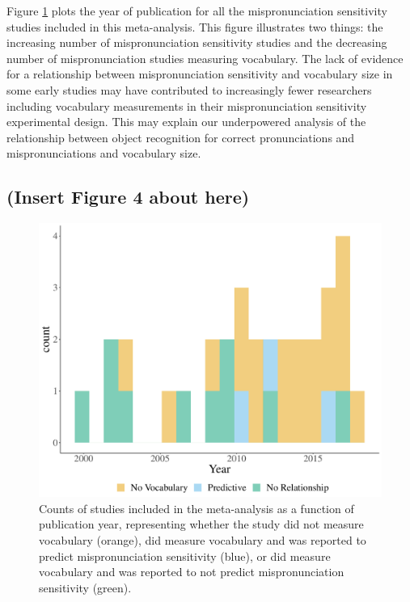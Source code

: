 \documentclass[man]{apa6}
\begin{document}
Figure \ref{fig:Vocabdescribe1} plots the year of publication for all the mispronunciation sensitivity studies included in this meta-analysis. This figure illustrates two things: the increasing number of mispronunciation sensitivity studies and the decreasing number of mispronunciation studies measuring vocabulary. The lack of evidence for a relationship between mispronunciation sensitivity and vocabulary size in some early studies may have contributed to increasingly fewer researchers including vocabulary measurements in their mispronunciation sensitivity experimental design. This may explain our underpowered analysis of the relationship between object recognition for correct pronunciations and mispronunciations and vocabulary size.

\hypertarget{insert-figure-4-about-here}{%
\subsection{(Insert Figure 4 about here)}\label{insert-figure-4-about-here}}

\begin{figure}
\centering
\includegraphics{VonHolzenBergmann_MPMetaAnalysis_files/figure-latex/Vocabdescribe1-1.pdf}
\caption{\label{fig:Vocabdescribe1}Counts of studies included in the meta-analysis as a function of publication year, representing whether the study did not measure vocabulary (orange), did measure vocabulary and was reported to predict mispronunciation sensitivity (blue), or did measure vocabulary and was reported to not predict mispronunciation sensitivity (green).}
\end{figure}
\end{document}
